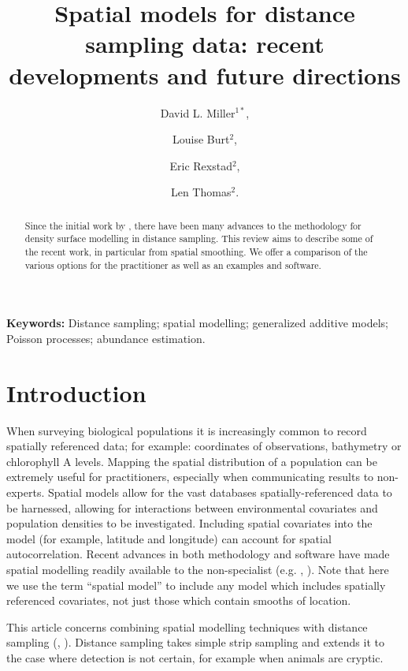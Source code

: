 \documentclass[a4paper,12pt]{article}
\title{Spatial models for distance sampling data: recent developments and future directions}
\author{
David L. Miller$^{1*}$, \and
Louise Burt$^{2}$, \and
Eric Rexstad$^{2}$, \and 
Len Thomas$^{2}$.}
\begin{document}
\maketitle


\begin{abstract}
  \noindent 
Since the initial work by \cite{Hedley:2004et}, there have been many advances to the methodology for density surface modelling in distance sampling. This review aims to describe some of the recent work, in particular from spatial smoothing.  We offer a comparison of the various options for the practitioner as well as an examples and software.

\end{abstract}

\noindent \textbf{Keywords:} Distance sampling; spatial modelling; generalized additive models; Poisson processes; abundance estimation.



\newpage


\section*{Introduction}

\label{s:intro}


When surveying biological populations it is increasingly common to record spatially referenced data; for example: coordinates of observations, bathymetry or chlorophyll A levels. Mapping the spatial distribution of a population can be extremely useful for practitioners, especially when communicating results to non-experts. Spatial models allow for the vast databases spatially-referenced data to be harnessed, allowing for interactions between environmental covariates and population densities to be investigated. Including spatial covariates into the model (for example, latitude and longitude) can account for spatial autocorrelation. Recent advances in both methodology and software have made spatial modelling readily available to the non-specialist (e.g. \cite{Wood:2006wz}, \cite{Rue:2009tw}). Note that  here we use the term ``spatial model'' to include any model which includes spatially referenced covariates, not just those which contain smooths of location.

This article concerns combining spatial modelling techniques with distance sampling (\cite{Buckland:2001vm}, \cite{Buckland:2004ts}). Distance sampling takes simple strip sampling and extends it to the case where detection is not certain, for example when animals are cryptic. 
\end{document}
